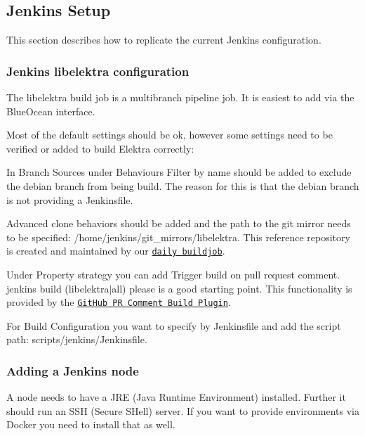 \subsection*{Jenkins Setup}

This section describes how to replicate the current Jenkins configuration.

\subsubsection*{Jenkins libelektra configuration}

The {\ttfamily libelektra} build job is a multibranch pipeline job. It is easiest to add via the Blue\+Ocean interface.

Most of the default settings should be ok, however some settings need to be verified or added to build Elektra correctly\+:


\begin{DoxyItemize}
\item In Branch Sources under Behaviours {\ttfamily Filter by name} should be added to exclude the {\ttfamily debian} branch from being build. The reason for this is that the {\ttfamily debian} branch is not providing a Jenkinsfile.
\item {\ttfamily Advanced clone behaviors} should be added and the path to the git mirror needs to be specified\+: {\ttfamily /home/jenkins/git\+\_\+mirrors/libelektra}. This reference repository is created and maintained by our \href{https://build.libelektra.org/jenkins/job/libelektra-daily/}{\tt daily buildjob}.
\item Under Property strategy you can add {\ttfamily Trigger build on pull request comment}. {\ttfamily jenkins build (libelektra$\vert$all) please} is a good starting point. This functionality is provided by the \href{https://wiki.jenkins-ci.org/display/JENKINS/GitHub+PR+Comment+Build+Plugin}{\tt Git\+Hub PR Comment Build Plugin}.
\item For Build Configuration you want to specify {\ttfamily by Jenkinsfile} and add the script path\+: {\ttfamily scripts/jenkins/\+Jenkinsfile}.
\end{DoxyItemize}

\subsubsection*{Adding a Jenkins node}

A node needs to have a J\+RE (Java Runtime Environment) installed. Further it should run an S\+SH (Secure S\+Hell) server. If you want to provide environments via Docker you need to install that as well.

